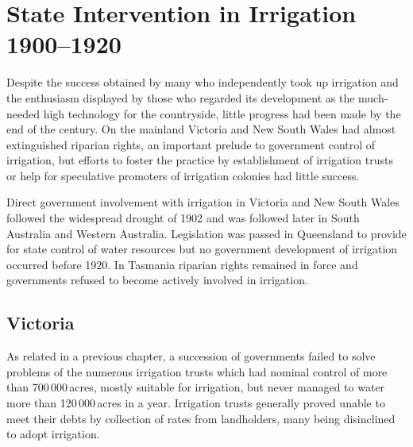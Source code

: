 
\setcounter{endnote}{0}

\chapter{State Intervention in Irrigation 1900--1920}
\label{ch:stateint}


Despite the success obtained by many who independently took up
irrigation and the enthusiasm displayed by those who regarded its
development as the much-needed high technology for the countryside,
little progress had been made by the end of the century.  On the
mainland Victoria and New South Wales had almost extinguished riparian
rights, an important prelude to government control of irrigation, but
efforts to foster the practice by establishment of irrigation trusts
or help for speculative promoters of irrigation colonies had little
success.

Direct government involvement with irrigation in Victoria and New
South Wales followed the widespread drought of 1902 and was followed
later in South Australia and Western Australia.  Legislation was
passed in Queensland to provide for state control of water resources
but no government development of irrigation occurred before 1920.  In
Tasmania riparian rights remained in force and governments refused to
become actively involved in irrigation.

\section*{Victoria}

As related in a previous chapter, a succession of governments failed
to solve problems of the numerous irrigation trusts which had nominal
control of more than 700\,000\,acres, mostly suitable for irrigation, but
never managed to water more than 120\,000\,acres in a year.  Irrigation
trusts generally proved unable to meet their debts by collection of
rates from landholders, many being disinclined to adopt
irrigation.


